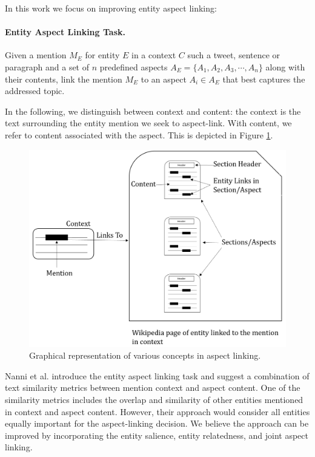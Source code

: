 \noindent In this work we focus on improving entity aspect linking:

\paragraph{\textbf{Entity Aspect Linking Task.}} Given a mention $M_E$ for entity $E$ in a context $C$ such a tweet, sentence or paragraph and a set of $n$ predefined aspects $A_{E} = \{A_1, A_2, A_3, \cdots, A_n\}$ along with their contents, link the mention $M_E$ to an aspect $A_i \in A_{E}$ that best captures the addressed topic. 

\bigskip
In the following, we distinguish between context and content: the context is the text surrounding the entity mention we seek to aspect-link. With content, we refer to content associated with the aspect. This is depicted in Figure \ref{fig:context-vs-content}.

\begin{figure}
    \centering
    \includegraphics [scale=0.6]{context-and-content.png}
    \caption{Graphical representation of various concepts in aspect linking.}
    \label{fig:context-vs-content}
\end{figure}

Nanni et al. \cite{nanni2018entity} introduce the entity aspect linking task and suggest a combination of text similarity metrics between mention context and aspect content. One of the similarity metrics includes the overlap and similarity of other entities mentioned in context and aspect content. However, their approach would consider all entities equally important for the aspect-linking decision. We believe the approach can be improved by incorporating the entity salience, entity relatedness, and joint aspect linking.  


